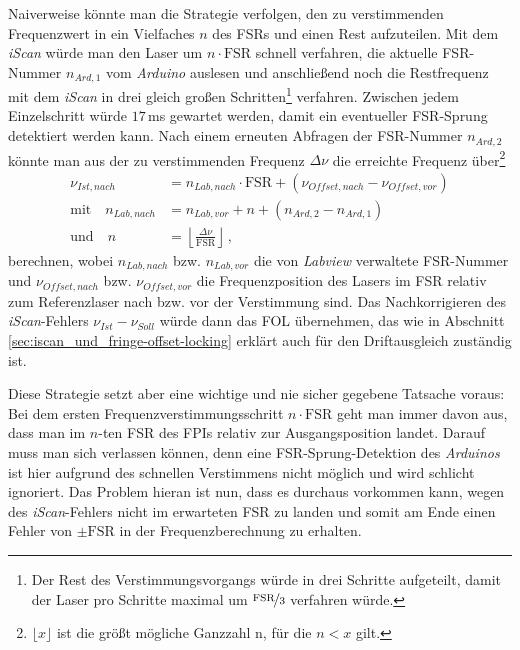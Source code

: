 Naiverweise könnte man die Strategie verfolgen, den zu verstimmenden
Frequenzwert in ein Vielfaches $n$ des FSRs und einen Rest aufzuteilen. Mit dem
\textit{iScan} würde man den Laser um $n\cdot\text{FSR}$ schnell verfahren,
die aktuelle FSR-Nummer $n_{Ard,1}$ vom \textit{Arduino} auslesen und anschließend
noch die Restfrequenz mit dem \textit{iScan} in drei gleich großen
Schritten\footnote{Der Rest des Verstimmungsvorgangs würde in drei Schritte
aufgeteilt, damit der Laser pro Schritte maximal um $\nicefrac{\text{FSR}}{3}$
verfahren würde.} verfahren. Zwischen jedem Einzelschritt würde $17\,$ms
gewartet werden, damit ein eventueller FSR-Sprung detektiert werden kann.
Nach einem erneuten Abfragen der FSR-Nummer $n_{Ard,2}$ könnte man aus der zu
verstimmenden Frequenz $\Delta\nu$ die erreichte Frequenz über\footnote{$\lfloor x\rfloor$ ist die größt mögliche Ganzzahl n,
für die $n<x$ gilt.}
\begin{equation}\label{eq:neue_frequenz_strategie_1}
	\begin{split}
		\nu_{Ist,nach} &=
		n_{Lab,nach}\cdot\text{FSR}+(\nu_{Offset,nach}-\nu_{Offset,vor})\\
		\text{mit}\quad
		n_{Lab,nach} &= n_{Lab,vor}+n+(n_{Ard,2}-n_{Ard,1})\\
		\text{und}\quad n &=
		\left\lfloor\frac{\Delta\nu}{\text{FSR}}\right\rfloor\,,
	\end{split}
\end{equation} berechnen, wobei $n_{Lab,nach}$ bzw. $n_{Lab,vor}$ die von \textit{Labview}
verwaltete FSR-Nummer und $\nu_{Offset,nach}$ bzw. $\nu_{Offset,vor}$ die
Frequenzposition des Lasers im FSR relativ zum Referenzlaser nach bzw. vor der
Verstimmung sind. Das Nachkorrigieren des \textit{iScan}-Fehlers
$\nu_{Ist}-\nu_{Soll}$ würde dann das FOL übernehmen, das wie in Abschnitt
\ref{sec:iscan_und_fringe-offset-locking} erklärt auch für den Driftausgleich
zuständig ist.\par
Diese Strategie setzt aber eine wichtige und nie sicher gegebene Tatsache
voraus: Bei dem ersten Frequenzverstimmungsschritt $n\cdot\text{FSR}$ geht man
immer davon aus, dass man im $n$-ten FSR des FPIs relativ zur Ausgangsposition
landet. Darauf muss man sich verlassen können, denn eine FSR-Sprung-Detektion
des \textit{Arduinos} ist hier aufgrund des schnellen Verstimmens nicht möglich
und wird schlicht ignoriert. Das Problem hieran ist nun, dass es durchaus vorkommen kann,
wegen des \textit{iScan}-Fehlers nicht im erwarteten FSR zu landen und somit am
Ende einen Fehler von $\pm\text{FSR}$ in der Frequenzberechnung zu erhalten.
